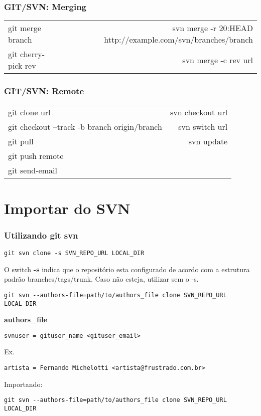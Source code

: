 \begin{frame}
\frametitle{GIT/SVN: Merging}
\scriptsize
\begin{tabular}{ l r }
git merge branch & svn merge -r 20:HEAD http://example.com/svn/branches/branch \\
git cherry-pick rev & svn merge -c rev url \\
\end{tabular}
\normalsize
\end{frame}

\begin{frame}
\frametitle{GIT/SVN: Remote}

\scriptsize
\begin{tabular}{ l r }
git clone url & svn checkout url \\
git checkout --track -b branch origin/branch & svn switch url \\
git pull & svn update \\
git push remote & \\
git send-email & \\
\end{tabular}
\normalsize

\end{frame}

\section{Importar do SVN}

\begin{frame}[fragile]
\frametitle{Utilizando git svn}

\scriptsize
\begin{verbatim}
git svn clone -s SVN_REPO_URL LOCAL_DIR
\end{verbatim}
\normalsize

O switch \textbf{-s} indica que o repositório esta configurado de acordo com a estrutura padrão branches/tags/trunk. Caso não esteja, utilizar sem o -s.

\scriptsize
\begin{verbatim}
git svn --authors-file=path/to/authors_file clone SVN_REPO_URL LOCAL_DIR
\end{verbatim}
\normalsize

\textbf{authors\_file}

\scriptsize
\begin{verbatim}
svnuser = gituser_name <gituser_email>
\end{verbatim}
\normalsize

Ex.

\begin{verbatim}
artista = Fernando Michelotti <artista@frustrado.com.br>
\end{verbatim}

Importando:

\scriptsize
\begin{verbatim}
git svn --authors-file=path/to/authors_file clone SVN_REPO_URL LOCAL_DIR 
\end{verbatim}
\normalsize

\end{frame}
